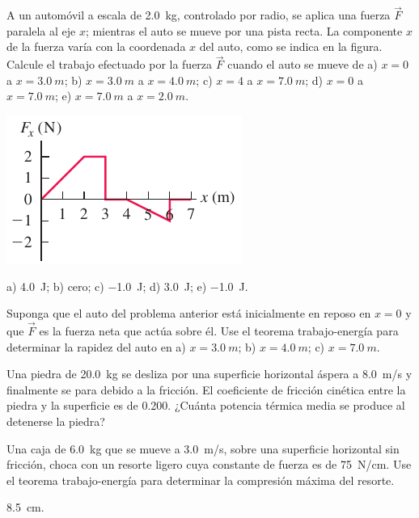 \documentclass[11pt]{article}
\begin{document}
\begin{multicols}{2}
\begin{exercise}
    A un automóvil a escala de \qty{2.0}{kg}, controlado por radio, se aplica una fuerza $\vec{F}$ paralela al eje $x$; mientras el auto se mueve por una pista recta. La componente $x$ de la fuerza varía con la coordenada $x$ del auto, como se indica en la figura. Calcule el trabajo efectuado por la fuerza $\vec{F}$ cuando el auto se mueve de a) $x = 0$ a $x = \qty{3.0}{m}$; b) $x = \qty{3.0}{m}$ a $x = \qty{4.0}{m}$; c) $x = 4$ a $x = \qty{7.0}{m}$; d) $x = 0$ a $x = \qty{7.0}{m}$; e) $x = \qty{7.0}{m}$ a $x = \qty{2.0}{m}$.
\begin{center}
    \includegraphics[scale=0.5]{figs/p-03.png}
\end{center}
\end{exercise}
\begin{solution}
a) \qty{4.0}{J}; b) cero; c) \qty{-1.0}{J}; d) \qty{3.0}{J}; e) \qty{-1.0}{J}.
\end{solution}
\end{multicols}

\begin{exercise}
Suponga que el auto del problema anterior está inicialmente en reposo en $x = 0$ y que $\vec{F}$ es la fuerza neta que actúa sobre él. Use el teorema trabajo-energía para determinar la rapidez del auto en a) $x = \qty{3.0}{m}$; b) $x = \qty{4.0}{m}$; c) $x = \qty{7.0}{m}$.
\end{exercise}

\begin{exercise}
    Una piedra de \qty{20.0}{kg} se desliza por una superficie horizontal áspera a \qty{8.0}{m/s} y finalmente se para debido a la fricción. El coeficiente de fricción cinética entre la piedra y la superficie es de \num{0.200}. ¿Cuánta potencia térmica media se produce al detenerse la piedra?
\end{exercise}

\begin{multicols}{2}
\begin{exercise}
    Una caja de \qty{6.0}{kg} que se mueve a \qty{3.0}{m/s}, sobre una superficie horizontal sin fricción, choca con un resorte ligero cuya constante de fuerza es de \qty{75}{N/cm}. Use el teorema trabajo-energía para determinar la compresión máxima del resorte.
\end{exercise}
\begin{solution}
    \qty{8.5}{cm}.
\end{solution}
\end{multicols}
\end{document}
